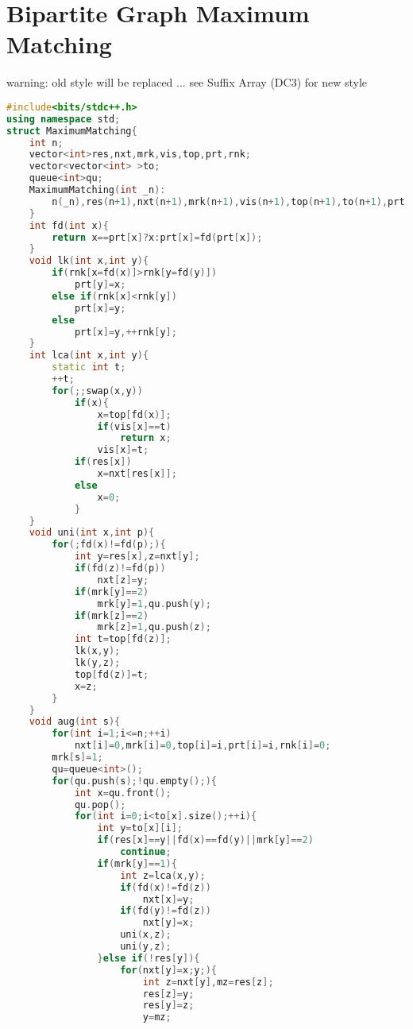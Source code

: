 \documentclass{book}
\begin{document}
\section{Bipartite Graph Maximum Matching}
warning: old style will be replaced ... see Suffix Array (DC3) for new style\begin{lstlisting}[language=C++,title={Bipartite Graph Maximum Matching.hpp (3121 bytes, 112 lines)}]
#include<bits/stdc++.h>
using namespace std;
struct MaximumMatching{
    int n;
    vector<int>res,nxt,mrk,vis,top,prt,rnk;
    vector<vector<int> >to;
    queue<int>qu;
    MaximumMatching(int _n):
        n(_n),res(n+1),nxt(n+1),mrk(n+1),vis(n+1),top(n+1),to(n+1),prt(n+1),rnk(n+1){
    }
    int fd(int x){
        return x==prt[x]?x:prt[x]=fd(prt[x]);
    }
    void lk(int x,int y){
        if(rnk[x=fd(x)]>rnk[y=fd(y)])
            prt[y]=x;
        else if(rnk[x]<rnk[y])
            prt[x]=y;
        else
            prt[x]=y,++rnk[y];
    }
    int lca(int x,int y){
        static int t;
        ++t;
        for(;;swap(x,y))
            if(x){
                x=top[fd(x)];
                if(vis[x]==t)
                    return x;
                vis[x]=t;
            if(res[x])
                x=nxt[res[x]];
            else
                x=0;
            }
    }
    void uni(int x,int p){
        for(;fd(x)!=fd(p);){
            int y=res[x],z=nxt[y];
            if(fd(z)!=fd(p))
                nxt[z]=y;
            if(mrk[y]==2)
                mrk[y]=1,qu.push(y);
            if(mrk[z]==2)
                mrk[z]=1,qu.push(z);
            int t=top[fd(z)];
            lk(x,y);
            lk(y,z);
            top[fd(z)]=t;
            x=z;
        }
    }
    void aug(int s){
        for(int i=1;i<=n;++i)
            nxt[i]=0,mrk[i]=0,top[i]=i,prt[i]=i,rnk[i]=0;
        mrk[s]=1;
        qu=queue<int>();
        for(qu.push(s);!qu.empty();){
            int x=qu.front();
            qu.pop();
            for(int i=0;i<to[x].size();++i){
                int y=to[x][i];
                if(res[x]==y||fd(x)==fd(y)||mrk[y]==2)
                    continue;
                if(mrk[y]==1){
                    int z=lca(x,y);
                    if(fd(x)!=fd(z))
                        nxt[x]=y;
                    if(fd(y)!=fd(z))
                        nxt[y]=x;
                    uni(x,z);
                    uni(y,z);
                }else if(!res[y]){
                    for(nxt[y]=x;y;){
                        int z=nxt[y],mz=res[z];
                        res[z]=y;
                        res[y]=z;
                        y=mz;

\end{lstlisting}
\end{document}
